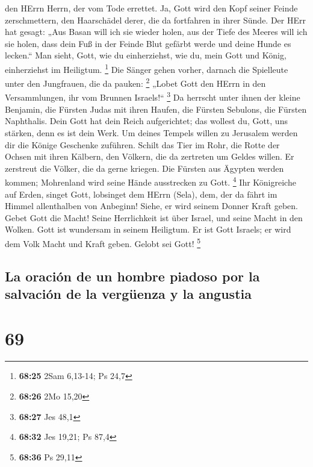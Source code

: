 den HErrn Herrn, der vom Tode errettet.  Ja, Gott wird
den Kopf seiner Feinde zerschmettern, den Haarschädel derer, die da
fortfahren in ihrer Sünde.  Der HErr hat gesagt: „Aus
Basan will ich sie wieder holen, aus der Tiefe des Meeres will ich sie
holen,  dass dein Fuß in der Feinde Blut gefärbt werde
und deine Hunde es lecken.``  Man sieht, Gott, wie du
einherziehst, wie du, mein Gott und König, einherziehst im Heiligtum.
\footnote{\textbf{68:25} 2Sam 6,13-14; Ps 24,7}  Die
Sänger gehen vorher, darnach die Spielleute unter den Jungfrauen, die da
pauken: \footnote{\textbf{68:26} 2Mo 15,20}  „Lobet Gott
den HErrn in den Versammlungen, ihr vom Brunnen Israels!{}`` \footnote{\textbf{68:27}
  Jes 48,1}  Da herrscht unter ihnen der kleine Benjamin,
die Fürsten Judas mit ihren Haufen, die Fürsten Sebulons, die Fürsten
Naphthalis.  Dein Gott hat dein Reich aufgerichtet; das
wollest du, Gott, uns stärken, denn es ist dein Werk.  Um
deines Tempels willen zu Jerusalem werden dir die Könige Geschenke
zuführen.  Schilt das Tier im Rohr, die Rotte der Ochsen
mit ihren Kälbern, den Völkern, die da zertreten um Geldes willen. Er
zerstreut die Völker, die da gerne kriegen.  Die Fürsten
aus Ägypten werden kommen; Mohrenland wird seine Hände ausstrecken zu
Gott. \footnote{\textbf{68:32} Jes 19,21; Ps 87,4}  Ihr
Königreiche auf Erden, singet Gott, lobsinget dem HErrn (Sela),
 dem, der da fährt im Himmel allenthalben von Anbeginn!
Siehe, er wird seinem Donner Kraft geben.  Gebet Gott die
Macht! Seine Herrlichkeit ist über Israel, und seine Macht in den
Wolken.  Gott ist wundersam in seinem Heiligtum. Er ist
Gott Israels; er wird dem Volk Macht und Kraft geben. Gelobt sei Gott!
\footnote{\textbf{68:36} Ps 29,11}

\hypertarget{la-oraciuxf3n-de-un-hombre-piadoso-por-la-salvaciuxf3n-de-la-verguxfcenza-y-la-angustia}{%
\subsection{La oración de un hombre piadoso por la salvación de la
vergüenza y la
angustia}\label{la-oraciuxf3n-de-un-hombre-piadoso-por-la-salvaciuxf3n-de-la-verguxfcenza-y-la-angustia}}

\hypertarget{section-68}{%
\section{69}\label{section-68}}

